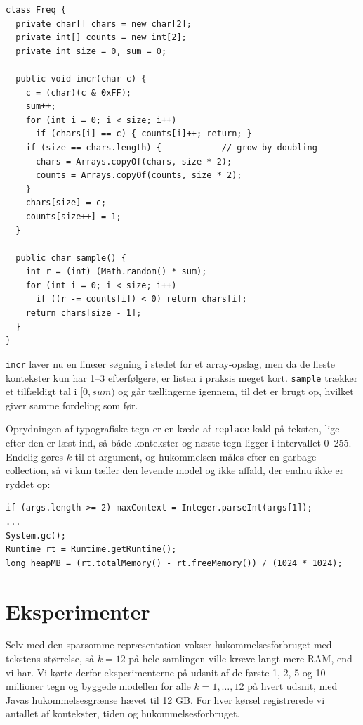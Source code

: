 \documentclass[11pt,a4paper]{article}
\begin{document}
\begin{lstlisting}
class Freq {
  private char[] chars = new char[2];
  private int[] counts = new int[2];
  private int size = 0, sum = 0;

  public void incr(char c) {
    c = (char)(c & 0xFF);
    sum++;
    for (int i = 0; i < size; i++)
      if (chars[i] == c) { counts[i]++; return; }
    if (size == chars.length) {            // grow by doubling
      chars = Arrays.copyOf(chars, size * 2);
      counts = Arrays.copyOf(counts, size * 2);
    }
    chars[size] = c;
    counts[size++] = 1;
  }

  public char sample() {
    int r = (int) (Math.random() * sum);
    for (int i = 0; i < size; i++)
      if ((r -= counts[i]) < 0) return chars[i];
    return chars[size - 1];
  }
}
\end{lstlisting}

\texttt{incr} laver nu en lineær søgning i stedet for et array-opslag, men da de
fleste kontekster kun har 1--3 efterfølgere, er listen i praksis meget kort.
\texttt{sample} trækker et tilfældigt tal i $[0, \mathit{sum})$ og går tællingerne
igennem, til det er brugt op, hvilket giver samme fordeling som før.

Oprydningen af typografiske tegn er en kæde af \texttt{replace}-kald på teksten,
lige efter den er læst ind, så både kontekster og næste-tegn ligger i intervallet
0--255. Endelig gøres $k$ til et argument, og hukommelsen måles efter en garbage
collection, så vi kun tæller den levende model og ikke affald, der endnu ikke er
ryddet op:

\begin{lstlisting}
if (args.length >= 2) maxContext = Integer.parseInt(args[1]);
...
System.gc();
Runtime rt = Runtime.getRuntime();
long heapMB = (rt.totalMemory() - rt.freeMemory()) / (1024 * 1024);
\end{lstlisting}

\section{Eksperimenter}

Selv med den sparsomme repræsentation vokser hukommelsesforbruget med tekstens
størrelse, så $k=12$ på hele samlingen ville kræve langt mere RAM, end vi har. Vi
kørte derfor eksperimenterne på udsnit af de første 1, 2, 5 og 10 millioner tegn og
byggede modellen for alle $k = 1, \dots, 12$ på hvert udsnit, med Javas
hukommelsesgrænse hævet til 12 GB. For hver kørsel registrerede vi antallet af
kontekster, tiden og hukommelsesforbruget.
\end{document}
